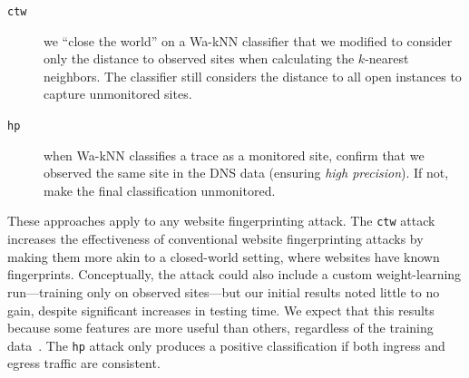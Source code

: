 \begin{description}
	\item[\texttt{ctw}] we ``close the world''
	on a Wa-kNN classifier that we modified to consider only the distance to observed
	sites when calculating the $k$-nearest neighbors. The classifier still
	considers the distance to all open instances to capture unmonitored sites.
	\item[\texttt{hp}] when Wa-kNN classifies a trace as a monitored site, confirm
	that we observed the same site in the DNS data (ensuring {\em high precision}). If
	not, make the final classification unmonitored.
\end{description}
\noindent
These approaches apply to any website fingerprinting attack. The
\texttt{ctw} attack increases the effectiveness of conventional website
fingerprinting attacks by making them more akin to a closed-world setting,
where websites have known fingerprints.
Conceptually, the attack could also include
a custom weight-learning run---training only on observed sites---but our initial
results noted little to no gain, despite significant increases in
testing time.
We expect that this results because some features are more useful than others,
regardless of the training data~\cite{kfingerprinting}. The \texttt{hp} attack
only produces a positive classification if both ingress and egress
traffic are consistent.
